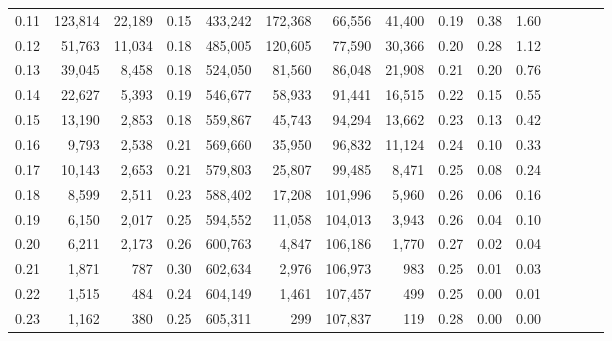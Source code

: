 \begin{tabular}{rrrcrrrrrrrrrrr}
0.11 &  123,814 &  22,189 &                                       0.15 &  433,242 &  172,368 &   66,556 &   41,400 &  0.19 &  0.38 &                         1.60 \\
0.12 &   51,763 &  11,034 &                                       0.18 &  485,005 &  120,605 &   77,590 &   30,366 &  0.20 &  0.28 &                         1.12 \\
0.13 &   39,045 &   8,458 &                                       0.18 &  524,050 &   81,560 &   86,048 &   21,908 &  0.21 &  0.20 &                         0.76 \\
0.14 &   22,627 &   5,393 &                                       0.19 &  546,677 &   58,933 &   91,441 &   16,515 &  0.22 &  0.15 &                         0.55 \\
0.15 &   13,190 &   2,853 &                                       0.18 &  559,867 &   45,743 &   94,294 &   13,662 &  0.23 &  0.13 &                         0.42 \\
0.16 &    9,793 &   2,538 &                                       0.21 &  569,660 &   35,950 &   96,832 &   11,124 &  0.24 &  0.10 &                         0.33 \\
0.17 &   10,143 &   2,653 &                                       0.21 &  579,803 &   25,807 &   99,485 &    8,471 &  0.25 &  0.08 &                         0.24 \\
0.18 &    8,599 &   2,511 &                                       0.23 &  588,402 &   17,208 &  101,996 &    5,960 &  0.26 &  0.06 &                         0.16 \\
0.19 &    6,150 &   2,017 &                                       0.25 &  594,552 &   11,058 &  104,013 &    3,943 &  0.26 &  0.04 &                         0.10 \\
0.20 &    6,211 &   2,173 &                                       0.26 &  600,763 &    4,847 &  106,186 &    1,770 &  0.27 &  0.02 &                         0.04 \\
0.21 &    1,871 &     787 &                                       0.30 &  602,634 &    2,976 &  106,973 &      983 &  0.25 &  0.01 &                         0.03 \\
0.22 &    1,515 &     484 &                                       0.24 &  604,149 &    1,461 &  107,457 &      499 &  0.25 &  0.00 &                         0.01 \\
0.23 &    1,162 &     380 &                                       0.25 &  605,311 &      299 &  107,837 &      119 &  0.28 &  0.00 &                         0.00 \\

\end{tabular}
